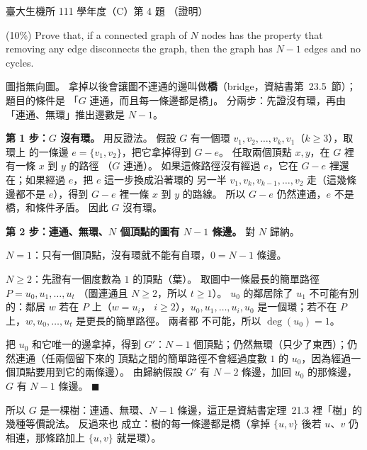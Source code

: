 \begin{pastexam}[label={px:ntu-111-bime-ds-04}]{臺大生機所 111 學年度（C）第 4 題}
（證明）

(10\%) Prove that, if a connected graph of $N$ nodes has the property that removing any edge
disconnects the graph, then the graph has $N-1$ edges and no cycles.
\end{pastexam}

\begin{pastsoln}
圖指無向圖。 拿掉以後會讓圖不連通的邊叫做\textbf{橋}（bridge，資結書第~23.5~節）；題目的條件是
「$G$ 連通，而且每一條邊都是橋」。 分兩步：先證沒有環，再由「連通、無環」推出邊數是 $N - 1$。

\textbf{第 1 步：$G$ 沒有環。} 用反證法。 假設 $G$ 有一個環 $v_1, v_2, \ldots, v_k, v_1$（$k \ge 3$），取環上
的一條邊 $e = \{v_1, v_2\}$，把它拿掉得到 $G - e$。 任取兩個頂點 $x, y$，在 $G$ 裡有一條 $x$ 到 $y$ 的路徑
（$G$ 連通）。 如果這條路徑沒有經過 $e$，它在 $G - e$ 裡還在；如果經過 $e$，把 $e$ 這一步換成沿著環的
另一半 $v_1, v_k, v_{k-1}, \ldots, v_2$ 走（這幾條邊都不是 $e$），得到 $G - e$ 裡一條 $x$ 到 $y$ 的路線。 所以
$G - e$ 仍然連通，$e$ 不是橋，和條件矛盾。 因此 $G$ 沒有環。

\textbf{第 2 步：連通、無環、$N$ 個頂點的圖有 $N - 1$ 條邊。} 對 $N$ 歸納。

$N = 1$：只有一個頂點，沒有環就不能有自環，$0 = N - 1$ 條邊。

$N \ge 2$：先證有一個度數為 $1$ 的頂點（葉）。 取圖中一條最長的簡單路徑 $P = u_0, u_1, \ldots, u_t$
（圖連通且 $N \ge 2$，所以 $t \ge 1$）。 $u_0$ 的鄰居除了 $u_1$ 不可能有別的：鄰居 $w$ 若在 $P$ 上（$w = u_i$，
$i \ge 2$），$u_0, u_1, \ldots, u_i, u_0$ 是一個環；若不在 $P$ 上，$w, u_0, \ldots, u_t$ 是更長的簡單路徑。 兩者都
不可能，所以 $\deg(u_0) = 1$。

把 $u_0$ 和它唯一的邊拿掉，得到 $G'$：$N - 1$ 個頂點；仍然無環（只少了東西）；仍然連通（任兩個留下來的
頂點之間的簡單路徑不會經過度數 $1$ 的 $u_0$，因為經過一個頂點要用到它的兩條邊）。 由歸納假設 $G'$ 有
$N - 2$ 條邊，加回 $u_0$ 的那條邊，$G$ 有 $N - 1$ 條邊。 \hfill$\blacksquare$

所以 $G$ 是一棵樹：連通、無環、$N - 1$ 條邊，這正是資結書定理~21.3 裡「樹」的幾種等價說法。 反過來也
成立：樹的每一條邊都是橋（拿掉 $\{u, v\}$ 後若 $u$、$v$ 仍相連，那條路加上 $\{u, v\}$ 就是環）。
\end{pastsoln}
